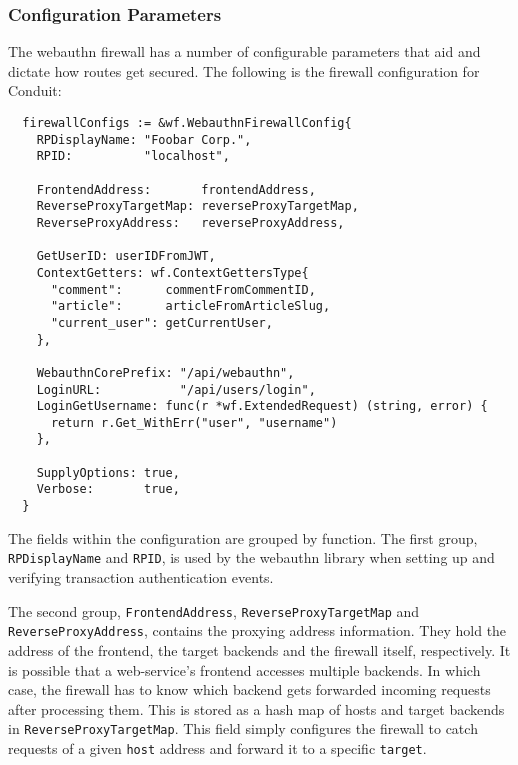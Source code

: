 \subsubsection{Configuration Parameters}\label{Sec:ConfigurationParameters}

The webauthn firewall has a number of configurable parameters that aid and dictate how routes get secured. The following is the firewall configuration for Conduit:

\begin{lstlisting}
  firewallConfigs := &wf.WebauthnFirewallConfig{
    RPDisplayName: "Foobar Corp.",
    RPID:          "localhost",

    FrontendAddress:       frontendAddress,
    ReverseProxyTargetMap: reverseProxyTargetMap,
    ReverseProxyAddress:   reverseProxyAddress,

    GetUserID: userIDFromJWT,
    ContextGetters: wf.ContextGettersType{
      "comment":      commentFromCommentID,
      "article":      articleFromArticleSlug,
      "current_user": getCurrentUser,
    },

    WebauthnCorePrefix: "/api/webauthn",
    LoginURL:           "/api/users/login",
    LoginGetUsername: func(r *wf.ExtendedRequest) (string, error) {
      return r.Get_WithErr("user", "username")
    },

    SupplyOptions: true,
    Verbose:       true,
  }
\end{lstlisting}

The fields within the configuration are grouped by function. The first group, \lstinline{RPDisplayName} and \lstinline{RPID}, is used by the webauthn library when setting up and verifying transaction authentication events. 


The second group, \lstinline{FrontendAddress}, \lstinline{ReverseProxyTargetMap} and \lstinline{ReverseProxyAddress}, contains the proxying address information. They hold the address of the frontend, the target backends and the firewall itself, respectively. It is possible that a web-service's frontend accesses multiple backends. In which case, the firewall has to know which backend gets forwarded incoming requests after processing them. This is stored as a hash map of hosts and target backends in \lstinline{ReverseProxyTargetMap}. This field simply configures the firewall to catch requests of a given \lstinline{host} address and forward it to a specific \lstinline{target}.

